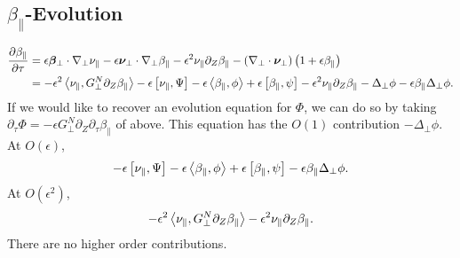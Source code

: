 \documentclass{article}
\newcommand{\para}{\parallel}
\newcommand{\ep}{\epsilon}
\newcommand{\np}{\nabla_\perp}
\newcommand{\lap}{\Delta_\perp}
\newcommand{\p}{\partial}
\newcommand{\deriv}[2]{\frac{\p #1}{\p #2}}
\newcommand{\GN}{G_\perp^N}
\newcommand{\pth} [1] {\left( #1 \right) }
\newcommand{\br} [1] {\left[ #1 \right] }
\begin{document}
\subsection{$\beta_\para$-Evolution}
\begin{align*}
    \deriv{\beta_\para}{\tau} &= \ep\bm{\beta}_\perp\cdot\np\nu_\para - \ep \bm{\nu}_\perp \cdot\np\beta_\para - \ep^2\nu_\para\p_Z\beta_\para - \pth{\np\cdot\bm{\nu}_\perp} \pth{1+\ep\beta_\para} \\
    &= - \ep^2\Braket{\nu_\para, \GN\p_Z\beta_\para} - \ep\br{\nu_\para, \Psi} - \ep\Braket{\beta_\para, \phi} + \ep\br{\beta_\para, \psi} - \ep^2\nu_\para\p_Z\beta_\para - \lap\phi - \ep\beta_\para\lap\phi.
\end{align*}
If we would like to recover an evolution equation for $\Phi$, we can do so by taking $\p_\tau\Phi = -\ep\GN\p_Z\p_\tau\beta_\para$ of above. This equation has the $O(1)$ contribution $-\lap\phi$. At $O(\ep)$, 
\begin{align*}
    -\ep\br{\nu_\para, \Psi} - \ep\Braket{\beta_\para, \phi} + \ep\br{\beta_\para, \psi} - \ep\beta_\para\lap\phi.
\end{align*}
At $O(\ep^2)$,
\begin{align*}
    -\ep^2\Braket{\nu_\para, \GN\p_Z\beta_\para} - \ep^2\nu_\para\p_Z\beta_\para.
\end{align*}
There are no higher order contributions.
\end{document}
